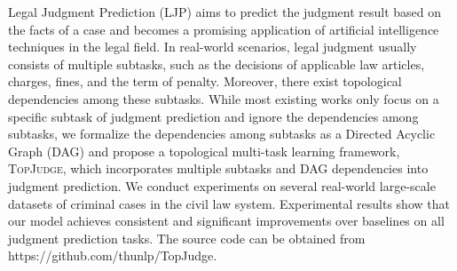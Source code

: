 Legal Judgment Prediction (LJP) aims to predict the judgment result based on the facts of a case and becomes a promising application of artificial intelligence techniques in the legal field. In real-world scenarios, legal judgment usually consists of multiple subtasks, such as the decisions of applicable law articles, charges, fines, and the term of penalty. Moreover, there exist topological dependencies among these subtasks. While most existing works only focus on a specific subtask of judgment prediction and ignore the dependencies among subtasks, we formalize the dependencies among subtasks as a Directed Acyclic Graph (DAG) and propose a topological multi-task learning framework, \textsc{TopJudge}, which incorporates multiple subtasks and DAG dependencies into judgment prediction. We conduct experiments on several real-world large-scale datasets of criminal cases in the civil law system. Experimental results show that our model achieves consistent and significant improvements over baselines on all judgment prediction tasks. The source code can be obtained from https://github.com/thunlp/TopJudge.
